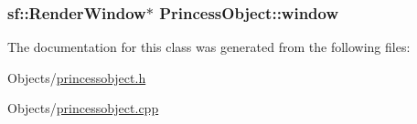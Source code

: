 \subsubsection[{\texorpdfstring{window}{window}}]{\setlength{\rightskip}{0pt plus 5cm}sf\+::\+Render\+Window$\ast$ Princess\+Object\+::window\hspace{0.3cm}{\ttfamily [protected]}}\hypertarget{classPrincessObject_abcf11c1e0917384e52839524ab1e5ee4}{}\label{classPrincessObject_abcf11c1e0917384e52839524ab1e5ee4}


The documentation for this class was generated from the following files\+:\begin{DoxyCompactItemize}
\item 
Objects/\hyperlink{princessobject_8h}{princessobject.\+h}\item 
Objects/\hyperlink{princessobject_8cpp}{princessobject.\+cpp}\end{DoxyCompactItemize}
